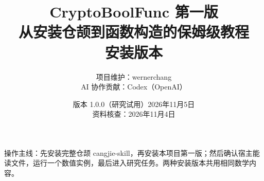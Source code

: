 \documentclass[UTF8,a4paper,11pt,fontset=fandol]{ctexart}
\title{\color{ink}CryptoBoolFunc 第一版\\\large 从安装仓颉到函数构造的保姆级教程\\\HostName 安装版本}
\author{项目维护：wernerchang\\AI 协作贡献：Codex（OpenAI）}
\date{版本 1.0.0（研究试用）\quad 2026年11月5日\\\small 资料核查：2026年11月4日}
\newcommand{\note}[1]{\par\noindent\colorbox{light}{\parbox{0.94\linewidth}{\small #1}}\par}
\begin{document}
\sloppy\raggedright
\maketitle
\note{操作主线：先安装完整仓颉 cangjie-skill，再安装本项目第一版；然后确认宿主能读文件，运行一个数值实例，最后进入研究任务。两种安装版本共用相同数学内容。}
\tableofcontents
\clearpage
\end{document}
